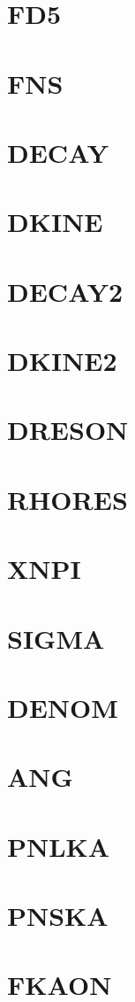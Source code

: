 \documentclass[10pt,UTF8]{ctexbook}
\begin{document}
\section{FD5}
\section{FNS}
\section{DECAY}
\section{DKINE}
\section{DECAY2}
\section{DKINE2}
\section{DRESON}
\section{RHORES}
\section{XNPI}
\section{SIGMA}
\section{DENOM}
\section{ANG}
\section{PNLKA}
\section{PNSKA}
\section{FKAON}
\end{document}
